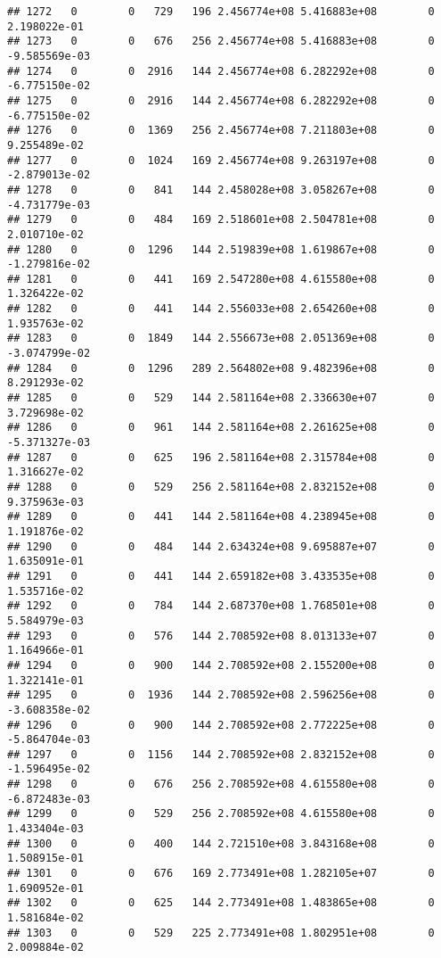 \documentclass[
]{article}
\begin{document}
\begin{enumerate}
\begin{verbatim}
## 1272   0        0   729   196 2.456774e+08 5.416883e+08        0  2.198022e-01
## 1273   0        0   676   256 2.456774e+08 5.416883e+08        0 -9.585569e-03
## 1274   0        0  2916   144 2.456774e+08 6.282292e+08        0 -6.775150e-02
## 1275   0        0  2916   144 2.456774e+08 6.282292e+08        0 -6.775150e-02
## 1276   0        0  1369   256 2.456774e+08 7.211803e+08        0  9.255489e-02
## 1277   0        0  1024   169 2.456774e+08 9.263197e+08        0 -2.879013e-02
## 1278   0        0   841   144 2.458028e+08 3.058267e+08        0 -4.731779e-03
## 1279   0        0   484   169 2.518601e+08 2.504781e+08        0  2.010710e-02
## 1280   0        0  1296   144 2.519839e+08 1.619867e+08        0 -1.279816e-02
## 1281   0        0   441   169 2.547280e+08 4.615580e+08        0  1.326422e-02
## 1282   0        0   441   144 2.556033e+08 2.654260e+08        0  1.935763e-02
## 1283   0        0  1849   144 2.556673e+08 2.051369e+08        0 -3.074799e-02
## 1284   0        0  1296   289 2.564802e+08 9.482396e+08        0  8.291293e-02
## 1285   0        0   529   144 2.581164e+08 2.336630e+07        0  3.729698e-02
## 1286   0        0   961   144 2.581164e+08 2.261625e+08        0 -5.371327e-03
## 1287   0        0   625   196 2.581164e+08 2.315784e+08        0  1.316627e-02
## 1288   0        0   529   256 2.581164e+08 2.832152e+08        0  9.375963e-03
## 1289   0        0   441   144 2.581164e+08 4.238945e+08        0  1.191876e-02
## 1290   0        0   484   144 2.634324e+08 9.695887e+07        0  1.635091e-01
## 1291   0        0   441   144 2.659182e+08 3.433535e+08        0  1.535716e-02
## 1292   0        0   784   144 2.687370e+08 1.768501e+08        0  5.584979e-03
## 1293   0        0   576   144 2.708592e+08 8.013133e+07        0  1.164966e-01
## 1294   0        0   900   144 2.708592e+08 2.155200e+08        0  1.322141e-01
## 1295   0        0  1936   144 2.708592e+08 2.596256e+08        0 -3.608358e-02
## 1296   0        0   900   144 2.708592e+08 2.772225e+08        0 -5.864704e-03
## 1297   0        0  1156   144 2.708592e+08 2.832152e+08        0 -1.596495e-02
## 1298   0        0   676   256 2.708592e+08 4.615580e+08        0 -6.872483e-03
## 1299   0        0   529   256 2.708592e+08 4.615580e+08        0  1.433404e-03
## 1300   0        0   400   144 2.721510e+08 3.843168e+08        0  1.508915e-01
## 1301   0        0   676   169 2.773491e+08 1.282105e+07        0  1.690952e-01
## 1302   0        0   625   144 2.773491e+08 1.483865e+08        0  1.581684e-02
## 1303   0        0   529   225 2.773491e+08 1.802951e+08        0  2.009884e-02

\end{verbatim}
\end{enumerate}
\end{document}
